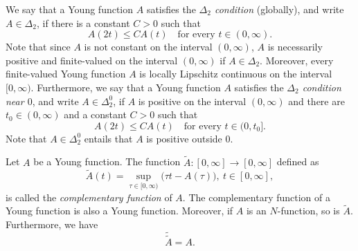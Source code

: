 \documentclass[nointlimits]{amsart}
\numberwithin{equation}{section}
\theoremstyle{plain}
\theoremstyle{definition}
\newcommand{\DTwo}{\Delta_2}
\newcommand{\DTwoZ}{\DTwo^0}
\newcommand{\tA}{\tilde{A}}
\newcommand{\ttA}{\tilde{\tA}}
\begin{document}
We say that a Young function $A$ satisfies the \emph{$\DTwo$ condition} (globally), and write $A\in\DTwo$, if there is a constant $C>0$ such that
\begin{equation*}
    A(2t) \leq C A(t) \quad \text{for every $t\in(0, \infty)$}.
\end{equation*}
Note that since $A$ is not constant on the interval $(0, \infty)$, $A$ is necessarily positive and finite-valued on the interval $(0, \infty)$ if $A\in\DTwo$. Moreover, every finite-valued Young function $A$ is locally Lipschitz continuous on the interval $[0, \infty)$. 
Furthermore, we say that a Young function $A$ satisfies the \emph{$\DTwo$ condition near $0$}, and write $A\in\DTwoZ$, if $A$ is positive on the interval $(0, \infty)$ and there are $t_0\in(0, \infty)$ and a constant $C>0$ such that
\begin{equation*}
    A(2t) \leq C A(t) \quad \text{for every $t\in(0, t_0]$}.
\end{equation*}
Note that $A\in\DTwoZ$ entails that $A$ is positive outside $0$. 

Let $A$ be a Young function. The function $\tilde A\colon[0,\infty]\to[0,\infty]$ defined as
\begin{equation*}
	\tA(t)=\sup_{\tau\in[0, \infty)}\big( \tau t-A(\tau) \big),\ t\in[0,\infty],
\end{equation*}
is called the \emph{complementary function} of $A$. The complementary function of a Young function is also a Young function. Moreover, if $A$ is an $N$-function, so is $\tA$. Furthermore, we have
\begin{equation}\label{prel:double_complementary}
    \ttA = A.
\end{equation}
\end{document}
